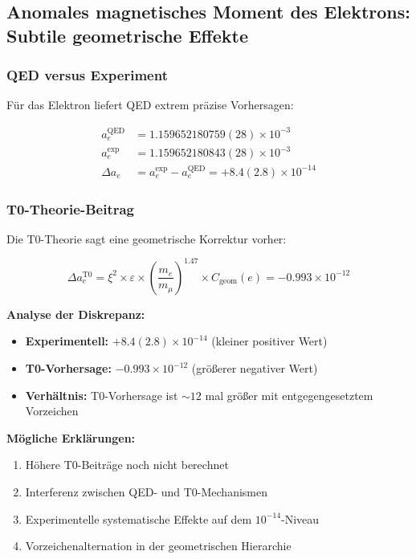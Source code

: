 \documentclass[12pt,a4paper]{article}
\numberwithin{equation}{section}
\newcommand{\xipar}{\xi}
\newcommand{\epsilonT}{\varepsilon}
\newcommand{\Cgeom}{C_{\text{geom}}}
\begin{document}
	\subsection{Anomales magnetisches Moment des Elektrons: Subtile geometrische Effekte}
	
	\subsubsection{QED versus Experiment}
	
	Für das Elektron liefert QED extrem präzise Vorhersagen:
	
	\begin{align}
		a_e^{\text{QED}} &= 1.159652180759(28) \times 10^{-3} \\
		a_e^{\exp} &= 1.159652180843(28) \times 10^{-3} \\
		\Delta a_e &= a_e^{\exp} - a_e^{\text{QED}} = +8.4(2.8) \times 10^{-14}
		\label{eq:electron_qed_comparison}
	\end{align}
	
	\subsubsection{T0-Theorie-Beitrag}
	
	Die T0-Theorie sagt eine geometrische Korrektur vorher:
	
	\begin{equation}
		\Delta a_e^{\text{T0}} = \xipar^2 \times \epsilonT \times \left(\frac{m_e}{m_\mu}\right)^{1.47} \times \Cgeom(e) = -0.993 \times 10^{-12}
		\label{eq:electron_t0_contribution}
	\end{equation}
	
	\textbf{Analyse der Diskrepanz:}
	\begin{itemize}
		\item \textbf{Experimentell:} $+8.4(2.8) \times 10^{-14}$ (kleiner positiver Wert)
		\item \textbf{T0-Vorhersage:} $-0.993 \times 10^{-12}$ (größerer negativer Wert)
		\item \textbf{Verhältnis:} T0-Vorhersage ist $\sim 12$ mal größer mit entgegengesetztem Vorzeichen
	\end{itemize}
	
	\textbf{Mögliche Erklärungen:}
	\begin{enumerate}
		\item Höhere T0-Beiträge noch nicht berechnet
		\item Interferenz zwischen QED- und T0-Mechanismen
		\item Experimentelle systematische Effekte auf dem $10^{-14}$-Niveau
		\item Vorzeichenalternation in der geometrischen Hierarchie
	\end{enumerate}
	
\end{document}
